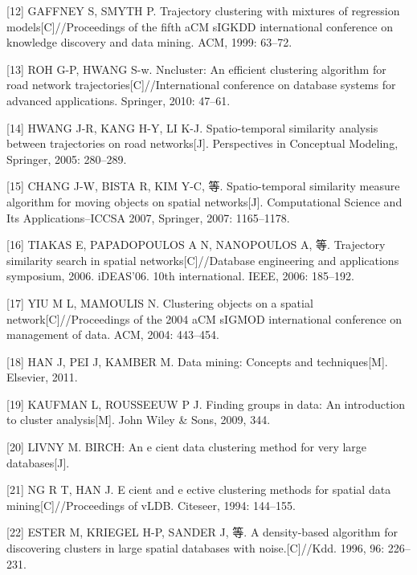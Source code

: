 \documentclass[]{article}
\begin{document}
\hypertarget{ref-gaffney1999trajectory}{}
{[}12{]} GAFFNEY S, SMYTH P. Trajectory clustering with mixtures of
regression models{[}C{]}//Proceedings of the fifth aCM sIGKDD
international conference on knowledge discovery and data mining. ACM,
1999: 63--72.

\hypertarget{ref-roh2010nncluster}{}
{[}13{]} ROH G-P, HWANG S-w. Nncluster: An efficient clustering
algorithm for road network trajectories{[}C{]}//International conference
on database systems for advanced applications. Springer, 2010: 47--61.

\hypertarget{ref-hwang2005spatio}{}
{[}14{]} HWANG J-R, KANG H-Y, LI K-J. Spatio-temporal similarity
analysis between trajectories on road networks{[}J{]}. Perspectives in
Conceptual Modeling, Springer, 2005: 280--289.

\hypertarget{ref-chang2007spatio}{}
{[}15{]} CHANG J-W, BISTA R, KIM Y-C, 等. Spatio-temporal similarity
measure algorithm for moving objects on spatial networks{[}J{]}.
Computational Science and Its Applications--ICCSA 2007, Springer, 2007:
1165--1178.

\hypertarget{ref-tiakas2006trajectory}{}
{[}16{]} TIAKAS E, PAPADOPOULOS A N, NANOPOULOS A, 等. Trajectory
similarity search in spatial networks{[}C{]}//Database engineering and
applications symposium, 2006. iDEAS'06. 10th international. IEEE, 2006:
185--192.

\hypertarget{ref-yiu2004clustering}{}
{[}17{]} YIU M L, MAMOULIS N. Clustering objects on a spatial
network{[}C{]}//Proceedings of the 2004 aCM sIGMOD international
conference on management of data. ACM, 2004: 443--454.

\hypertarget{ref-han2011data}{}
{[}18{]} HAN J, PEI J, KAMBER M. Data mining: Concepts and
techniques{[}M{]}. Elsevier, 2011.

\hypertarget{ref-kaufman2009finding}{}
{[}19{]} KAUFMAN L, ROUSSEEUW P J. Finding groups in data: An
introduction to cluster analysis{[}M{]}. John Wiley \& Sons, 2009, 344.

\hypertarget{ref-livnybirch}{}
{[}20{]} LIVNY M. BIRCH: An e cient data clustering method for very
large databases{[}J{]}.

\hypertarget{ref-ng1994cient}{}
{[}21{]} NG R T, HAN J. E cient and e ective clustering methods for
spatial data mining{[}C{]}//Proceedings of vLDB. Citeseer, 1994:
144--155.

\hypertarget{ref-ester1996density}{}
{[}22{]} ESTER M, KRIEGEL H-P, SANDER J, 等. A density-based algorithm
for discovering clusters in large spatial databases with
noise.{[}C{]}//Kdd. 1996, 96: 226--231.
\end{document}
